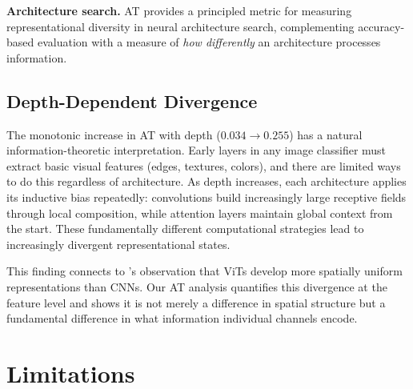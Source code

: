 \documentclass{article}
\begin{document}
\textbf{Architecture search.} AT provides a principled metric for measuring representational diversity in neural architecture search, complementing accuracy-based evaluation with a measure of \emph{how differently} an architecture processes information.

\subsection{Depth-Dependent Divergence}

The monotonic increase in AT with depth ($0.034 \to 0.255$) has a natural information-theoretic interpretation. Early layers in any image classifier must extract basic visual features (edges, textures, colors), and there are limited ways to do this regardless of architecture. As depth increases, each architecture applies its inductive bias repeatedly: convolutions build increasingly large receptive fields through local composition, while attention layers maintain global context from the start. These fundamentally different computational strategies lead to increasingly divergent representational states.

This finding connects to \citet{raghu2021vision}'s observation that ViTs develop more spatially uniform representations than CNNs. Our AT analysis quantifies this divergence at the feature level and shows it is not merely a difference in spatial structure but a fundamental difference in what information individual channels encode.

\section{Limitations}
\label{sec:limitations}
\end{document}
